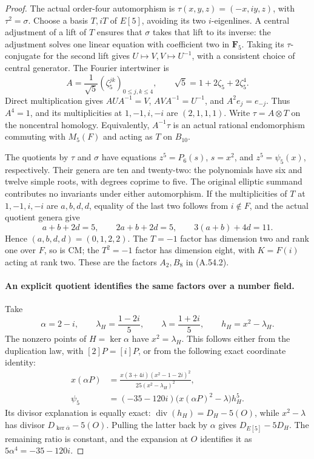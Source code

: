 \begin{proof}
The actual order-four automorphism is
\(\tau(x,y,z)=(-x,iy,z)\), with \(\tau^2=\sigma\).
Choose a basis \(T,iT\) of \(E[5]\), avoiding its two
\(i\)-eigenlines. A central adjustment of a lift of \(T\)
ensures that \(\sigma\) takes that lift to its inverse:
the adjustment solves one linear equation with coefficient two
in \(\mathbf F_5\). Taking its \(\tau\)-conjugate for the
second lift gives \(U\mapsto V,V\mapsto U^{-1}\), with a
consistent choice of central generator. The Fourier intertwiner
is
\[
 A=\frac1{\sqrt5}(\zeta _5^{jk})_{0\le j,k\le4},
 \qquad \sqrt5=1+2\zeta _5+2\zeta _5^4.
                                                               \tag{A.54.4}
\]
Direct multiplication gives \(AUA^{-1}=V\),
\(AVA^{-1}=U^{-1}\), and \(A^2e_j=e_{-j}\).
Thus \(A^4=1\), and its multiplicities at \(1,-1,i,-i\)
are \((2,1,1,1)\). Write \(\tau=A\otimes T\) on the
noncentral homology. Equivalently, \(A^{-1}\tau\) is an actual
rational endomorphism commuting with \(M_5(F)\) and acting
as \(T\) on \(B_{10}\).

The quotients by \(\tau\) and \(\sigma\) have equations
\(z^5=P_6(s)\), \(s=x^2\), and \(z^5=\psi _5(x)\),
respectively. Their genera are ten and twenty-two: the polynomials
have six and twelve simple roots, with degrees coprime to five.
The original elliptic summand contributes no invariants under either
automorphism. If the multiplicities of \(T\) at \(1,-1,i,-i\)
are \(a,b,d,d\), equality of the last two follows from \(i\notin F\),
and the actual quotient genera give
\[
 a+b+2d=5,\qquad 2a+b+2d=5,
 \qquad3(a+b)+4d=11.
\]
Hence \((a,b,d,d)=(0,1,2,2)\). The \(T=-1\) factor has
dimension two and rank one over \(F\), so is CM; the \(T^2=-1\)
factor has dimension eight, with \(K=F(i)\) acting at rank two.
These are the factors \(A_2,B_8\) in (A.54.2).

\paragraph{An explicit quotient identifies the same factors over a number field.}
Take
\[
 \alpha=2-i,\qquad \lambda_H=\frac{1-2i}{5},\qquad
 \lambda=\frac{1+2i}{5},\qquad h_H=x^2-\lambda_H.
\]
The nonzero points of \(H=\ker\alpha\) have \(x^2=\lambda_H\).
This follows either from the duplication law, with
\([2]P=[i]P\), or from the following exact coordinate identity:
\[
 \begin{aligned}
 x(\alpha P)&=
 \frac{x(3+4i)(x^2-1-2i)^2}{25(x^2-\lambda_H)^2},
 \\
 \psi _5&=(-35-120i)\bigl(x(\alpha P)^2-\lambda\bigr)h_H^5.
 \end{aligned}
                                                               \tag{A.54.5}
\]
Its divisor explanation is equally exact:
\(\operatorname{div}(h_H)=D_H-5(O)\), while
\(x^2-\lambda\) has divisor \(D_{\ker\bar\alpha}-5(O)\).
Pulling the latter back by \(\alpha\) gives
\(D_{E[5]}-5D_H\). The remaining ratio is constant, and
the expansion at \(O\) identifies it as \(5\alpha^4=-35-120i\).


\end{proof}
